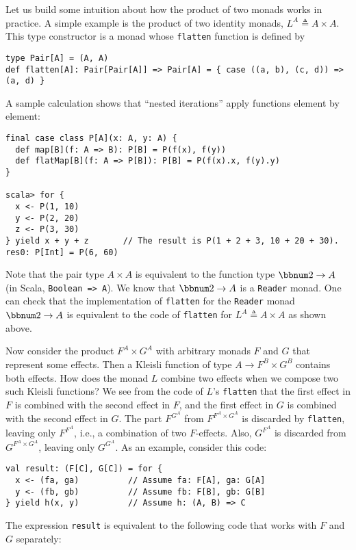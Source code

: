 Let us build some intuition about how the product of two monads works
in practice. A simple example is the product of two identity monads,
$L^{A}\triangleq A\times A$. This type constructor is a monad whose
\lstinline!flatten! function is defined by
\begin{lstlisting}
type Pair[A] = (A, A)
def flatten[A]: Pair[Pair[A]] => Pair[A] = { case ((a, b), (c, d)) => (a, d) }
\end{lstlisting}
A sample calculation shows that \textsf{``}nested iterations\textsf{''} apply functions
element by element:
\begin{lstlisting}
final case class P[A](x: A, y: A) {
  def map[B](f: A => B): P[B] = P(f(x), f(y))
  def flatMap[B](f: A => P[B]): P[B] = P(f(x).x, f(y).y)
}

scala> for {
  x <- P(1, 10)
  y <- P(2, 20)
  z <- P(3, 30)
} yield x + y + z       // The result is P(1 + 2 + 3, 10 + 20 + 30).
res0: P[Int] = P(6, 60)
\end{lstlisting}

Note that the pair type $A\times A$ is equivalent to the function
type $\bbnum 2\rightarrow A$ (in Scala, \lstinline!Boolean => A!).
We know that $\bbnum 2\rightarrow A$ is a \lstinline!Reader! monad.
One can check that the implementation of \lstinline!flatten! for
the \lstinline!Reader! monad $\bbnum 2\rightarrow A$ is equivalent
to the code of \lstinline!flatten! for $L^{A}\triangleq A\times A$
as shown above.

Now consider the product $F^{A}\times G^{A}$ with arbitrary monads
$F$ and $G$ that represent some effects. Then a Kleisli function
of type $A\rightarrow F^{B}\times G^{B}$ contains both effects. How
does the monad $L$ combine two effects when we compose two such Kleisli
functions? We see from the code of $L$\textsf{'}s \lstinline!flatten! that
the first effect in $F$ is combined with the second effect in $F$,
and the first effect in $G$ is combined with the second effect in
$G$. The part $F^{G^{A}}$ from $F^{F^{A}\times G^{A}}$ is discarded
by \lstinline!flatten!, leaving only $F^{F^{A}}$, i.e., a combination
of two $F$-effects. Also, $G^{F^{A}}$ is discarded from $G^{F^{A}\times G^{A}}$,
leaving only $G^{G^{A}}$. As an example, consider this code:
\begin{lstlisting}
val result: (F[C], G[C]) = for {
  x <- (fa, ga)          // Assume fa: F[A], ga: G[A]
  y <- (fb, gb)          // Assume fb: F[B], gb: G[B]
} yield h(x, y)          // Assume h: (A, B) => C
\end{lstlisting}
The expression \lstinline!result! is equivalent to the following
code that works with $F$ and $G$ separately:\vspace{-0.95\baselineskip}

